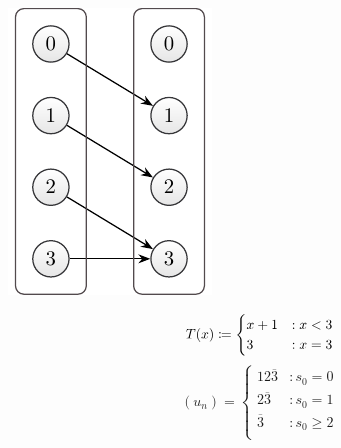 \documentclass{stdlocal}
\begin{document}
    \medskip
    \begin{minipage}{0.25\textwidth}
      \includegraphics[width=\textwidth]{figures/periodicity_example_b.pdf}
    \end{minipage}
    \hfill
    \begin{minipage}{0.73\textwidth}
      \[
        T(x) \coloneqq
        \begin{cases}
          x + 1 &: x < 3 \\
          3 &: x = 3
        \end{cases}
      \]
      \[
        (u_n) =
        \begin{cases}
          12\overline{3} &: s_0 = 0 \\
          2\overline{3} &: s_0 = 1 \\
          \overline{3} &: s_0 \geq 2 \\
        \end{cases}
      \]
    \end{minipage}
    \smallskip
\end{document}
